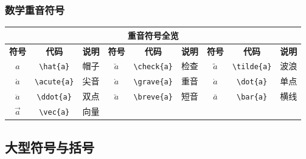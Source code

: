 \documentclass{article}
\begin{document}
\subsubsection{数学重音符号}
\begin{center}
      \footnotesize
      \begin{tabular}{ccc|ccc|ccc}
            \hline
            \multicolumn{9}{c}{\normalsize\textbf{重音符号全览}}                                                                                             \\
            \hline
            \textbf{符号} & \textbf{代码}      & \textbf{说明} & \textbf{符号} & \textbf{代码}      & \textbf{说明} & \textbf{符号} & \textbf{代码}      & \textbf{说明} \\
            \hline
            $\hat{a}$   & \verb|\hat{a}|   & 帽子          & $\check{a}$ & \verb|\check{a}| & 检查          & $\tilde{a}$ & \verb|\tilde{a}| & 波浪          \\
            $\acute{a}$ & \verb|\acute{a}| & 尖音          & $\grave{a}$ & \verb|\grave{a}| & 重音          & $\dot{a}$   & \verb|\dot{a}|   & 单点          \\
            $\ddot{a}$  & \verb|\ddot{a}|  & 双点          & $\breve{a}$ & \verb|\breve{a}| & 短音          & $\bar{a}$   & \verb|\bar{a}|   & 横线          \\
            $\vec{a}$   & \verb|\vec{a}|   & 向量          &             &                  &             &             &                  &             \\
            \hline
      \end{tabular}
\end{center}

\subsection{大型符号与括号}
\end{document}

